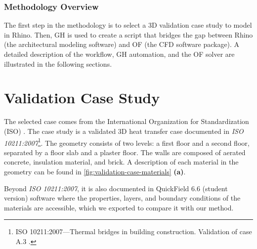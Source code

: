 \subsubsection{Methodology Overview}
The first step in the methodology is to select a 3D validation case study to model in Rhino. 
Then, \gls{GH}  is used to create a script that bridges the gap between Rhino (the architectural modeling software) and  \gls{OF} (the CFD software package). A detailed description of the workflow, \gls{GH} automation, and the \gls{OF} solver are illustrated in the following sections.





\section{Validation Case Study}
The selected case comes from the International Organization for Standardization (ISO) \cite{ISO}. The case study is a validated 3D heat transfer case documented in \textit{ISO 10211:2007}\footnote{ISO 10211:2007---Thermal bridges in building construction. Validation of case A.3 \cite{ISO}.}. 
The geometry consists of two levels: a first floor and a second floor, separated by a floor slab and a plaster floor. The walls are composed of aerated concrete, insulation material, and brick.
A description of each material in the geometry can be found in \ref{fig:validation-case-materials} \textbf{(a)}.

Beyond \textit{ISO 10211:2007}, it is also documented in QuickField 6.6 (student version) software where the properties, layers, and boundary conditions of the materials are accessible, which we exported to compare it with our method. 

   



